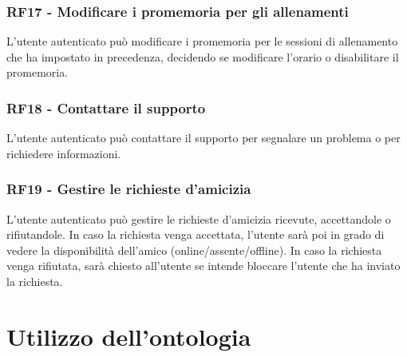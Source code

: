 \documentclass[12pt, a4paper]{article}
\begin{document}
\subsubsection*{\hypertarget{RF17}{RF17 - Modificare i promemoria per gli allenamenti}}

L'utente autenticato può modificare i promemoria per le sessioni di allenamento che ha impostato in precedenza, decidendo se modificare l'orario o disabilitare il promemoria.

\subsubsection*{\hypertarget{RF18}{RF18 - Contattare il supporto}}

L'utente autenticato può contattare il supporto per segnalare un problema o per richiedere informazioni.

\subsubsection*{\hypertarget{RF19}{RF19 - Gestire le richieste d'amicizia}}

L'utente autenticato può gestire le richieste d'amicizia ricevute, accettandole o rifiutandole. In caso la richiesta venga accettata, l'utente sarà poi in grado di vedere la disponibilità dell'amico (online/assente/offline). In caso la richiesta venga rifiutata, sarà chiesto all'utente se intende bloccare l'utente che ha inviato la richiesta.

\newpage
\section{Utilizzo dell'ontologia}
\end{document}
